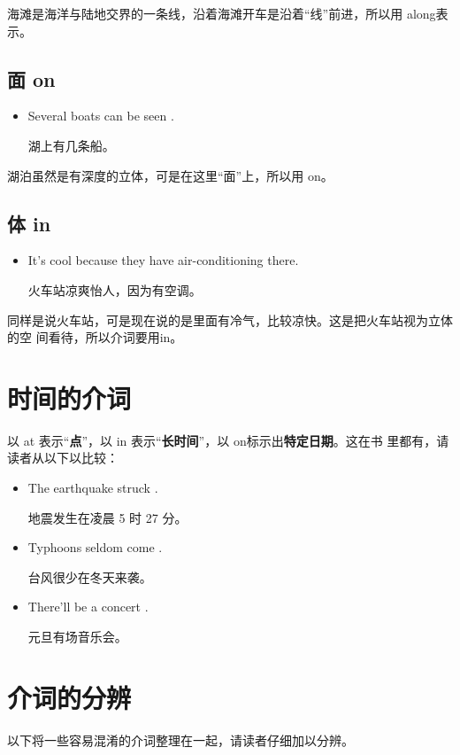 海滩是海洋与陆地交界的一条线，沿着海滩开车是沿着“线”前进，所以用 along表
示。

\subsection{面 on}
\begin{itemize}
\item  Several boats can be seen .

  湖上有几条船。
\end{itemize}
湖泊虽然是有深度的立体，可是在这里“面”上，所以用 on。

\subsection{体 in}

\begin{itemize}
\item It's cool  because they have
  air-conditioning there.

  火车站凉爽怡人，因为有空调。
\end{itemize}
同样是说火车站，可是现在说的是里面有冷气，比较凉快。这是把火车站视为立体的空
间看待，所以介词要用in。

\section{时间的介词}

以 at 表示“\textbf{点}”，以 in 表示“\textbf{长时间}”，以 on标示出\textbf{特定日期}。这在书
里都有，请读者从以下以比较：

\begin{itemize}
\item The earthquake struck .

  地震发生在凌晨 5 时 27 分。
\item  Typhoons seldom come .

  台风很少在冬天来袭。
\item  There'll be a concert .

  元旦有场音乐会。
\end{itemize}

\section{介词的分辨}

以下将一些容易混淆的介词整理在一起，请读者仔细加以分辨。

